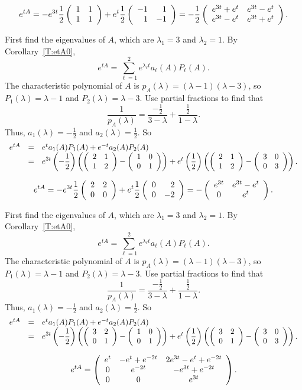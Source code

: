 \documentclass{ximera}
\begin{document}
 \ans
\[
e^{tA} = -e^{3t}\frac{1}{2}\left(\begin{array}{rr} 1 & 1\\ 1 &1\end{array}\right) +
e^t\frac{1}{2}\left(\begin{array}{rr} -1 & 1\\ 1 &-1\end{array}\right)
= -\frac{1}{2}\left(\begin{array}{cc} e^{3t} + e^{t} & e^{3t} - e^{t}\\ e^{3t} - e^{t} &e^{3t} + e^{t}\end{array}\right).
\]

\soln First find the eigenvalues of $A$, which are $\lambda_1 = 3$ and
$\lambda_2 = 1$.  By Corollary~\ref{T:etA0},
\[
e^{tA} = \sum_{\ell = 1}^2 e^{\lambda_\ell t}a_\ell(A)P_\ell(A).
\]
The characteristic polynomial of $A$ is $p_A(\lambda) = (\lambda -
1)(\lambda - 3)$, so $P_1(\lambda) = \lambda - 1$ and $P_2(\lambda) =
\lambda - 3$.  Use partial fractions to find that
\[
\frac{1}{p_A(\lambda)} = \frac{-\frac{1}{2}}{3 - \lambda} + \frac{\frac{1}{2}}
{1 - \lambda}.
\]
Thus, $a_1(\lambda) = -\frac{1}{2}$ and $a_2(\lambda) = \frac{1}{2}$.  So
\[
\begin{array}{rcl}
e^{tA} & = & e^ta_1(A)P_1(A) + e^{-t}a_2(A)P_2(A) \\
& = & \displaystyle e^{3t}\left(-\frac{1}{2}\right)\left(\left(\begin{array}{rr} 2 & 1\\ 1 &2\end{array}\right) -
\left(\begin{array}{rr} 1 & 0\\ 0 &1\end{array}\right)\right) + e^{t}\left(\frac{1}{2}\right)
\left(\left(\begin{array}{rr} 2 & 1\\ 1 &2\end{array}\right) - \left(\begin{array}{rr} 3 & 0\\ 0 &3\end{array}\right)\right).
\end{array}
\]

 \ans
\[
e^{tA} = -e^{3t}\frac{1}{2}\left(\begin{array}{rr} 2 & 2\\ 0 &0\end{array}\right) +
e^t\frac{1}{2}\left(\begin{array}{rr} 0 & 2\\ 0 &-2\end{array}\right)
= -\left(\begin{array}{cc} e^{3t} & e^{3t} - e^{t}\\ 0 &e^{t}\end{array}\right).
\]

\soln First find the eigenvalues of $A$, which are $\lambda_1 = 3$ and
$\lambda_2 = 1$.  By Corollary~\ref{T:etA0},
\[
e^{tA} = \sum_{\ell = 1}^2 e^{\lambda_\ell t}a_\ell(A)P_\ell(A).
\]
The characteristic polynomial of $A$ is $p_A(\lambda) = (\lambda -
1)(\lambda - 3)$, so $P_1(\lambda) = \lambda - 1$ and $P_2(\lambda) =
\lambda - 3$.  Use partial fractions to find that
\[
\frac{1}{p_A(\lambda)} = \frac{-\frac{1}{2}}{3 - \lambda} + \frac{\frac{1}{2}}
{1 - \lambda}.
\]
Thus, $a_1(\lambda) = -\frac{1}{2}$ and $a_2(\lambda) = \frac{1}{2}$.  So
\[
\begin{array}{rcl}
e^{tA} & = & e^ta_1(A)P_1(A) + e^{-t}a_2(A)P_2(A) \\
& = & \displaystyle e^{3t}\left(-\frac{1}{2}\right)\left(\left(\begin{array}{rr} 3 & 2\\ 0 &1\end{array}\right) -
\left(\begin{array}{rr} 1 & 0\\ 0 &1\end{array}\right)\right) + e^{t}\left(\frac{1}{2}\right)
\left(\left(\begin{array}{rr} 3 & 2\\ 0 &1\end{array}\right) - \left(\begin{array}{rr} 3 & 0\\ 0 &3\end{array}\right)\right).
\end{array}
\]


 \ans
\[
e^{tA} =
\left(\begin{array}{ccc} e^t & -e^t + e^{-2t} & 2e^{3t} - e^t + e^{-2t} \\ 0 & e^{-2t} & -e^{3t} + e^{-2t} \\ 0 & 0 & e^{3t}\end{array}\right).
\]
\end{document}
